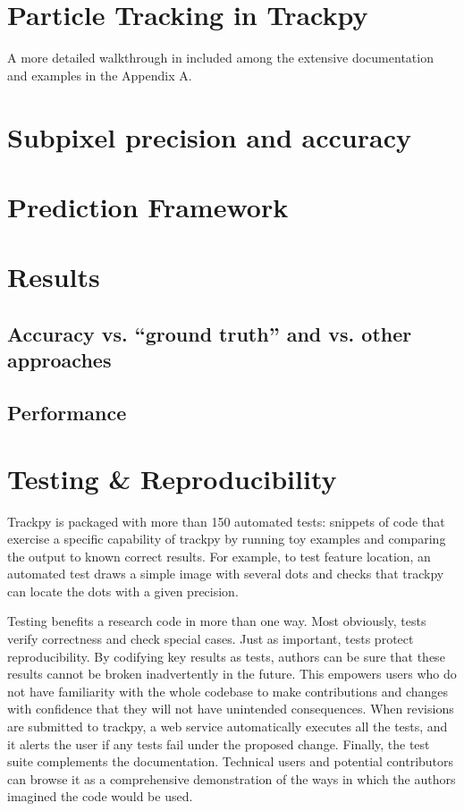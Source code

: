 \section{Particle Tracking in Trackpy}



A more detailed walkthrough in included among the extensive documentation and examples in the Appendix A.

\section{Subpixel precision and accuracy}



\section{Prediction Framework}
\section{Results}
\subsection{Accuracy vs. ``ground truth'' and vs. other approaches}
\subsection{Performance}
\section{Testing \& Reproducibility}

Trackpy is packaged with more than 150 automated tests: snippets of code that exercise a specific capability of trackpy by running toy examples and comparing the output to known correct results. For example, to test feature location, an automated test draws a simple image with several dots and checks that trackpy can locate the dots with a given precision.

Testing benefits a research code in more than one way. Most obviously, tests verify correctness and check special cases. Just as important, tests protect reproducibility. By codifying key results as tests, authors can be sure that these results cannot be broken inadvertently in the future. This empowers users who do not have familiarity with the whole codebase to make contributions and changes with confidence that they will not have unintended consequences. When revisions are submitted to trackpy, a web service automatically executes all the tests, and it alerts the user if any tests fail under the proposed change. Finally, the test suite complements the documentation. Technical users and potential contributors can browse it as a comprehensive demonstration of the ways in which the authors imagined the code would be used.

